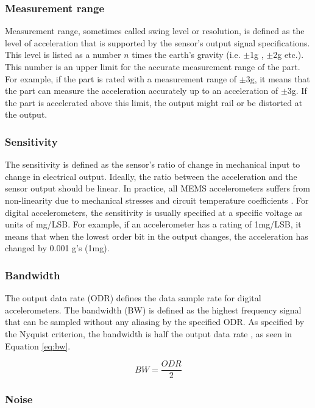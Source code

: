 \subsubsection{Measurement range}
Measurement range, sometimes called swing level or resolution, is defined as the level of acceleration that is supported by the sensor’s output signal specifications. This level is listed as a number $n$ times the earth’s gravity (i.e. $\pm$1g , $\pm$2g etc.). This number is an upper limit for the accurate measurement range of the part. For example, if the part is rated with a measurement range of $\pm$3g, it means that the part can measure the acceleration accurately up to an acceleration of $\pm$3g.  If the part is accelerated above this limit, the output might rail or be distorted at the output.

\subsubsection{Sensitivity}
The sensitivity is defined as the sensor's ratio of change in mechanical input to change in electrical output. Ideally, the ratio between the acceleration and the sensor output should be linear. In practice, all MEMS accelerometers suffers from non-linearity due to mechanical stresses and circuit temperature coefficients  \cite{analog_accel_guide}. For digital accelerometers, the sensitivity is usually specified at a specific voltage as units of mg/LSB. For example, if an accelerometer has a rating of 1mg/LSB, it means that when the lowest order bit in the output changes, the acceleration has changed by 0.001 g's (1mg).

\subsubsection{Bandwidth}

The output data rate (ODR) defines the data sample rate for digital accelerometers. The bandwidth (BW) is defined as the highest frequency signal that can be sampled without any aliasing by the specified ODR. As specified by the Nyquist criterion, the bandwidth is half the output data rate \cite{analog_accel_guide}, as seen in Equation \ref{eq:bw}. 

\begin{equation}
BW = \frac{ODR}{2}
\label{eq:bw}
\end{equation}

\subsubsection{Noise}

